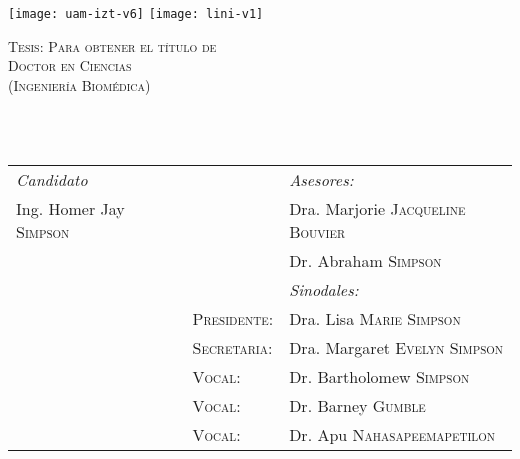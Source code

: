 
\begin{titlepage}

\begin{minipage}{\textwidth}
  \vspace{-3cm}
  \hspace{-2em}
     \texttt{[image: uam-izt-v6]}
  \hspace{19em}
     \texttt{[image: lini-v1]}
\end{minipage}

\begin{center}
	\vspace{0.1cm}

	\begin{minipage}{0.9\textwidth}
		\centering
		\textsc{Tesis: Para obtener el título de\\ Doctor en Ciencias \\(Ingeniería Biomédica)}
		\vspace{1em}
   \end{minipage}

   \begin{minipage}{.8\textwidth}
      \centering
		\HRule \\[0.3cm]
		\\
		\HRule
   \end{minipage}
		
	\vspace{1em}
	\begin{tabular}{lp{.2cm}ll}
		\textit{Candidato}
		  & 
		  & 
		  & \textit{Asesores:}\\
		Ing. Homer Jay \textsc{Simpson} 
		  &
		  &
		  & Dra. Marjorie \textsc{Jacqueline Bouvier}\\
		&
		  &
		  & Dr. Abraham \textsc{Simpson}\\[2em]
		&
		&
		& \textit{Sinodales:}\\
		&
		&\textsc{Presidente}:
		& Dra. Lisa \textsc{Marie Simpson}\\[2.5em]
		&
		&\textsc{Secretaria}:
		& Dra. Margaret \textsc{Evelyn Simpson}\\[2.5em]
		&
		&\textsc{Vocal}:
		& Dr. Bartholomew \textsc{Simpson}\\[2.5em]
		&
		&\textsc{Vocal}:
		& Dr. Barney \textsc{Gumble}\\[2.5em]
		&
		&\textsc{Vocal}:
		& Dr. Apu \textsc{Nahasapeemapetilon}\\
	\end{tabular}



\end{center}
\end{titlepage}
